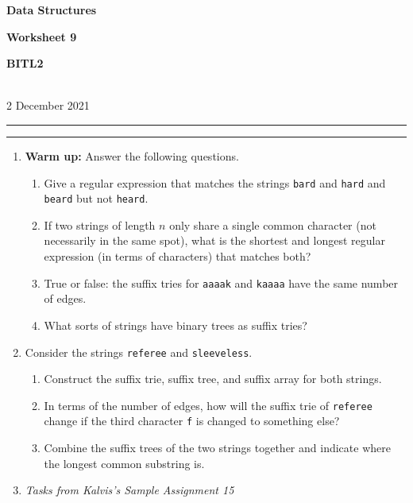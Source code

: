 \documentclass[a4paper,12pt]{article}
\begin{document}
\begin{center}
\parbox{3.5cm}{\textbf{Data Structures}} \hfill {\bf\Huge Worksheet 9} \hfill \parbox{3.5cm}{\flushright\textbf{BITL2}} \\[5pt]
\rm\small 2 December 2021
\end{center}

\hrule\vspace{2pt}\hrule

\begin{enumerate}

\item \textbf{Warm up:} Answer the following questions.
\begin{enumerate}
\item Give a regular expression that matches the strings \texttt{bard} and \texttt{hard} and \texttt{beard} but not \texttt{heard}.
\item If two strings of length $n$ only share a single common character (not necessarily in the same spot), what is the shortest and longest regular expression (in terms of characters) that matches both?
\item True or false: the suffix tries for \texttt{aaaak} and \texttt{kaaaa} have the same number of edges.
\item What sorts of strings have binary trees as suffix tries?
\end{enumerate}

\vspace{10pt}
\item Consider the strings \texttt{referee} and \texttt{sleeveless}.
\begin{enumerate}
\item Construct the suffix trie, suffix tree, and suffix array for both strings. 
\item In terms of the number of edges, how will the suffix trie of \texttt{referee} change if the third character \texttt{f} is changed to something else?
\item Combine the suffix trees of the two strings together and indicate where the longest common substring is.
\end{enumerate}

\vspace{10pt}
\item \textit{Tasks from Kalvis's Sample Assignment 15}

\end{enumerate}
\end{document}
